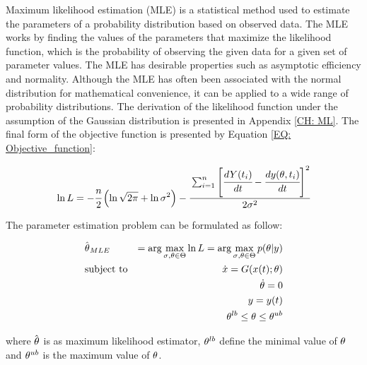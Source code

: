\documentclass[../Article_Sensitivity_Analsysis.tex]{subfiles}
\begin{document}
	Maximum likelihood estimation (MLE) is a statistical method used to estimate the parameters of a probability distribution based on observed data. The MLE works by finding the values of the parameters that maximize the likelihood function, which is the probability of observing the given data for a given set of parameter values. The MLE has desirable properties such as asymptotic efficiency and normality. Although the MLE has often been associated with the normal distribution for mathematical convenience, it can be applied to a wide range of probability distributions. The derivation of the likelihood function under the assumption of the Gaussian distribution is presented in Appendix \ref{CH: ML}. The final form of the objective function is presented by Equation \ref{EQ: Objective_function}:
	
	{\footnotesize
		\begin{equation} \label{EQ: Objective_function}
			\ln L = -\cfrac{n}{2} \left( \ln \sqrt{2 \pi} + \ln {\color{black} \sigma}^2 \right)
			- \cfrac{ \sum_{i=1}^{n} \left[  \cfrac{d {Y}(t_i)}{dt} - \cfrac{d{\color{black}y}({\color{black} \theta}, t_i)}{dt} \right]^2 }{2 {\color{black} \sigma}^2}
		\end{equation}
	}
	
	The parameter estimation problem can be formulated as follow:
	
	{\footnotesize
		\begin{equation}
			\begin{aligned} \label{EQ: Optimization_formulation_MLE}
				&\hat{{\color{black} \theta}}_{MLE} &= \arg \max_{{\color{black} \sigma}, {\color{black} \theta} \in \Theta} \ln L = \arg \max_{{\color{black} \sigma},{\color{black} \theta} \in \Theta} p({\color{black} \theta}|{\color{black}y}) \\
				&\text{subject to}
				& \dot{ {\color{black}x} } = {\color{black}G}({\color{black} x}(t);{\color{black} \theta}) \\
				&& {\color{black} \dot{\theta}} = 0 \\
				&& {\color{black}y} = {\color{black}y}(t) \\
				&& {\color{black} \theta}^{lb} \leq {\color{black} \theta} \leq {\color{black} \theta}^{ub}
			\end{aligned}
	\end{equation} } 
	
	where $\hat{{\color{black} \theta}}$ is as maximum likelihood estimator, ${\color{black} \theta}^{lb}$ define the minimal value of ${\color{black} \theta}$ and ${\color{black} \theta}^{ub}$ is the maximum value of ${\color{black} \theta}$.
	
\end{document}
